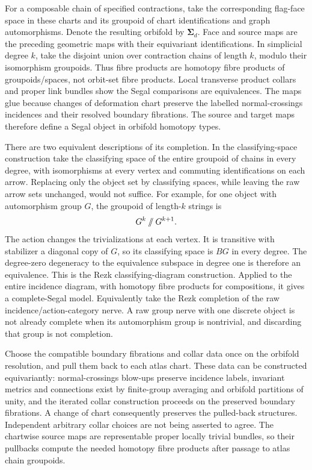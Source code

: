 For a composable chain of specified contractions, take the corresponding flag-face space in these charts and its groupoid of chart identifications and graph automorphisms. Denote the resulting orbifold by \(\boldsymbol\Sigma_d\). Face and source maps are the preceding geometric maps with their equivariant identifications. In simplicial degree \(k\), take the disjoint union over contraction chains of length \(k\), modulo their isomorphism groupoids. Thus fibre products are homotopy fibre products of groupoids/spaces, not orbit-set fibre products. Local transverse product collars and proper link bundles show the Segal comparisons are equivalences. The maps glue because changes of deformation chart preserve the labelled normal-crossings incidences and their resolved boundary fibrations. The source and target maps therefore define a Segal object in orbifold homotopy types.

There are two equivalent descriptions of its completion. In the classifying-space construction take the classifying space of the entire groupoid of chains in every degree, with isomorphisms at every vertex and commuting identifications on each arrow. Replacing only the object set by classifying spaces, while leaving the raw arrow sets unchanged, would not suffice. For example, for one object with automorphism group \(G\), the groupoid of length-\(k\) strings is \[
 G^k\mathbin{/\mkern-6mu/}G^{k+1}.
\] The action changes the trivializations at each vertex. It is transitive with stabilizer a diagonal copy of \(G\), so its classifying space is \(BG\) in every degree. The degree-zero degeneracy to the equivalence subspace in degree one is therefore an equivalence. This is the Rezk classifying-diagram construction. Applied to the entire incidence diagram, with homotopy fibre products for compositions, it gives a complete-Segal model. Equivalently take the Rezk completion of the raw incidence/action-category nerve. A raw group nerve with one discrete object is not already complete when its automorphism group is nontrivial, and discarding that group is not completion.

Choose the compatible boundary fibrations and collar data once on the orbifold resolution, and pull them back to each atlas chart. These data can be constructed equivariantly: normal-crossings blow-ups preserve incidence labels, invariant metrics and connections exist by finite-group averaging and orbifold partitions of unity, and the iterated collar construction proceeds on the preserved boundary fibrations. A change of chart consequently preserves the pulled-back structures. Independent arbitrary collar choices are not being asserted to agree. The chartwise source maps are representable proper locally trivial bundles, so their pullbacks compute the needed homotopy fibre products after passage to atlas chain groupoids.

